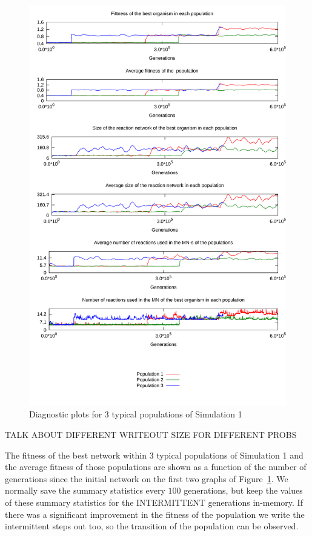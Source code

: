 \documentclass[10pt,a4paper]{article}
\begin{document}
\begin{figure}[htpb]
	\centering
	\includegraphics[width=1\linewidth]{simulation1.pdf}
	\caption{Diagnostic plots for 3 typical populations of Simulation 1}
	\label{fig:simulation1}
\end{figure}

TALK ABOUT DIFFERENT WRITEOUT SIZE FOR DIFFERENT PROBS

The fitness of the best network within $3$ typical populations of Simulation 1 and the average fitness of those populations are shown as a function of the number of generations since the initial network on the first two graphs of Figure~\ref{fig:simulation1}. We normally save the summary statistics every $100$ generations, but keep the values of these summary statistics for the INTERMITTENT generations in-memory. If there was a significant improvement in the fitness of the population we write the intermittent steps out too, so the transition of the population can be observed. 
\end{document}
